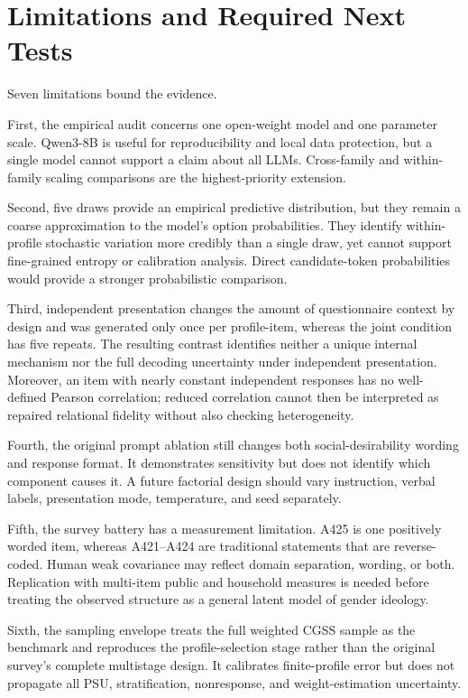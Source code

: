\documentclass[10pt,twocolumn]{article}
\newcommand{\CGSS}{CGSS\xspace}
\begin{document}
\section{Limitations and Required Next Tests}

Seven limitations bound the evidence.

First, the empirical audit concerns one open-weight model and one parameter scale. Qwen3-8B is useful
for reproducibility and local data protection, but a single model cannot support a claim about all
LLMs. Cross-family and within-family scaling comparisons are the highest-priority extension.

Second, five draws provide an empirical predictive distribution, but they remain a coarse
approximation to the model's option probabilities. They identify within-profile stochastic
variation more credibly than a single draw, yet cannot support fine-grained entropy or calibration
analysis. Direct candidate-token probabilities would provide a stronger probabilistic comparison.

Third, independent presentation changes the amount of questionnaire context by design and was
generated only once per profile-item, whereas the joint condition has five repeats. The resulting
contrast identifies neither a unique internal mechanism nor the full decoding uncertainty under
independent presentation. Moreover, an item with nearly constant independent responses has no
well-defined Pearson correlation; reduced correlation cannot then be interpreted as repaired
relational fidelity without also checking heterogeneity.

Fourth, the original prompt ablation still changes both social-desirability wording and response
format. It demonstrates sensitivity but does not identify which component causes it. A future
factorial design should vary instruction, verbal labels, presentation mode, temperature, and seed
separately.

Fifth, the survey battery has a measurement limitation. A425 is one positively worded item, whereas
A421--A424 are traditional statements that are reverse-coded. Human weak covariance may reflect
domain separation, wording, or both. Replication with multi-item public and household measures is
needed before treating the observed structure as a general latent model of gender ideology.

Sixth, the sampling envelope treats the full weighted \CGSS sample as the benchmark and reproduces
the profile-selection stage rather than the original survey's complete multistage design. It
calibrates finite-profile error but does not propagate all PSU, stratification, nonresponse, and
weight-estimation uncertainty.
\end{document}

